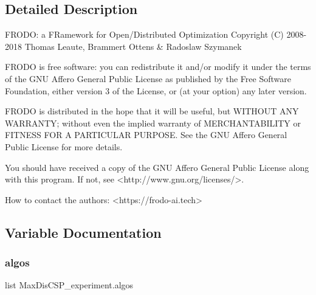 \subsection{Detailed Description}
\begin{DoxyVerb}FRODO: a FRamework for Open/Distributed Optimization
Copyright (C) 2008-2018  Thomas Leaute, Brammert Ottens & Radoslaw Szymanek

FRODO is free software: you can redistribute it and/or modify
it under the terms of the GNU Affero General Public License as published by
the Free Software Foundation, either version 3 of the License, or
(at your option) any later version.

FRODO is distributed in the hope that it will be useful,
but WITHOUT ANY WARRANTY; without even the implied warranty of
MERCHANTABILITY or FITNESS FOR A PARTICULAR PURPOSE.  See the
GNU Affero General Public License for more details.

You should have received a copy of the GNU Affero General Public License
along with this program.  If not, see <http://www.gnu.org/licenses/>.


How to contact the authors: 
<https://frodo-ai.tech>
\end{DoxyVerb}
 

\subsection{Variable Documentation}
\mbox{\label{namespaceMaxDisCSP__experiment_ab252e0e7945c449f04928e25bfe7777b}} 
\subsubsection{\texorpdfstring{algos}{algos}}
{\footnotesize\ttfamily list Max\+Dis\+C\+S\+P\+\_\+experiment.\+algos}

